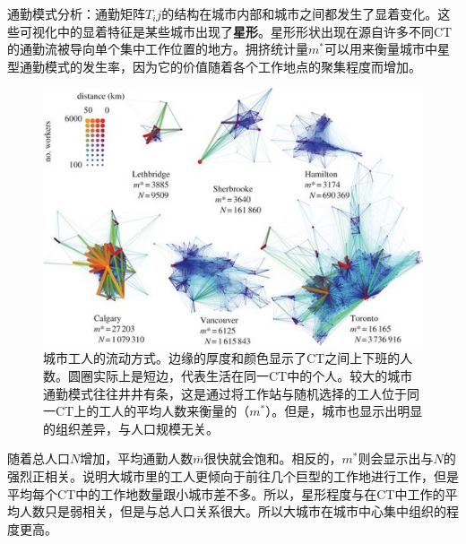 通勤模式分析：通勤矩阵$T_ij$的结构在城市内部和城市之间都发生了显着变化。这些可视化中的显着特征是某些城市出现了\textbf{星形}。星形形状出现在源自许多不同CT的通勤流被导向单个集中工作位置的地方。拥挤统计量$m^*$可以用来衡量城市中星型通勤模式的发生率，因为它的价值随着各个工作地点的聚集程度而增加。\begin{figure}
    \centering
    \includegraphics[width = 0.8\linewidth]{Pics/rspb20130763f01.jpg}
    \caption{城市工人的流动方式。边缘的厚度和颜色显示了CT之间上下班的人数。圆圈实际上是短边，代表生活在同一CT中的个人。较大的城市通勤模式往往井井有条，这是通过将工作站与随机选择的工人位于同一CT上的工人的平均人数来衡量的（$m^*$）。但是，城市也显示出明显的组织差异，与人口规模无关。}
\end{figure}
随着总人口$N$增加，平均通勤人数$\bar{m}$很快就会饱和。相反的，$m^*$则会显示出与$N$的强烈正相关。说明大城市里的工人更倾向于前往几个巨型的工作地进行工作，但是平均每个CT中的工作地数量跟小城市差不多。所以，星形程度与在CT中工作的平均人数只是弱相关，但是与总人口关系很大。所以大城市在城市中心集中组织的程度更高。

